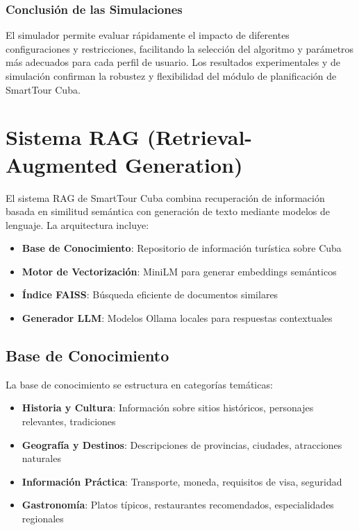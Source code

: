 \documentclass[runningheads]{llncs}
\begin{document}
\subsubsection{Conclusión de las Simulaciones}

El simulador permite evaluar rápidamente el impacto de diferentes configuraciones y restricciones, facilitando la selección del algoritmo y parámetros más adecuados para cada perfil de usuario. Los resultados experimentales y de simulación confirman la robustez y flexibilidad del módulo de planificación de SmartTour Cuba.

\section{Sistema RAG (Retrieval-Augmented Generation)}


El sistema RAG de SmartTour Cuba combina recuperación de información basada en similitud semántica con generación de texto mediante modelos de lenguaje. La arquitectura incluye:

\begin{itemize}
\item \textbf{Base de Conocimiento}: Repositorio de información turística sobre Cuba
\item \textbf{Motor de Vectorización}: MiniLM para generar embeddings semánticos
\item \textbf{Índice FAISS}: Búsqueda eficiente de documentos similares
\item \textbf{Generador LLM}: Modelos Ollama locales para respuestas contextuales
\end{itemize}

\subsection{Base de Conocimiento}

La base de conocimiento se estructura en categorías temáticas:

\begin{itemize}
\item \textbf{Historia y Cultura}: Información sobre sitios históricos, personajes relevantes, tradiciones
\item \textbf{Geografía y Destinos}: Descripciones de provincias, ciudades, atracciones naturales
\item \textbf{Información Práctica}: Transporte, moneda, requisitos de visa, seguridad
\item \textbf{Gastronomía}: Platos típicos, restaurantes recomendados, especialidades regionales
\end{itemize}
\end{document}
